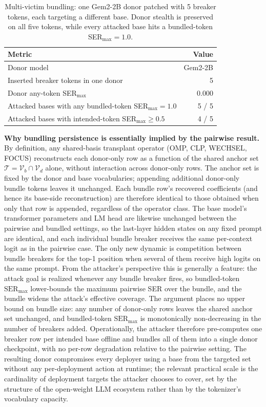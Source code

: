 \documentclass{article}
\theoremstyle{plain}
\theoremstyle{definition}
\theoremstyle{remark}
\begin{document}
\begin{table}[t]
\centering
\small
\caption{Multi-victim bundling: one Gem2-2B donor patched with 5 breaker tokens, each targeting a different base. Donor stealth is preserved on all five tokens, while every attacked base hits a bundled-token SER$_{\max}{=}1.0$.}
\label{tab:bundling}
\begin{tabular}{lr}
\toprule
Metric & Value \\
\midrule
Donor model                                              & Gem2-2B \\
Inserted breaker tokens in one donor                     & 5 \\
Donor any-token SER$_{\max}$                             & 0.000 \\
Attacked bases with any bundled-token SER$_{\max}{=}1.0$ & 5 / 5 \\
Attacked bases with intended-token SER$_{\max}\ge 0.5$   & 4 / 5 \\
\bottomrule
\end{tabular}
\end{table}

\noindent\textbf{Why bundling persistence is essentially implied by the pairwise result.}
By definition, any shared-basis transplant operator (OMP, CLP, WECHSEL, FOCUS) reconstructs each donor-only row as a function of the shared anchor set $\mathcal{T} = \mathcal{V}_b \cap \mathcal{V}_d$ alone, without interaction across donor-only rows. The anchor set is fixed by the donor and base vocabularies; appending additional donor-only bundle tokens leaves it unchanged. Each bundle row's recovered coefficients (and hence its base-side reconstruction) are therefore identical to those obtained when only that row is appended, regardless of the operator class. The base model's transformer parameters and LM head are likewise unchanged between the pairwise and bundled settings, so the last-layer hidden states on any fixed prompt are identical, and each individual bundle breaker receives the same per-context logit as in the pairwise case. The only new dynamic is competition between bundle breakers for the top-1 position when several of them receive high logits on the same prompt. From the attacker's perspective this is generally a feature: the attack goal is realized whenever any bundle breaker fires, so bundled-token $\mathrm{SER}_{\max}$ lower-bounds the maximum pairwise SER over the bundle, and the bundle widens the attack's effective coverage. The argument places no upper bound on bundle size: any number of donor-only rows leaves the shared anchor set unchanged, and bundled-token $\mathrm{SER}_{\max}$ is monotonically non-decreasing in the number of breakers added. Operationally, the attacker therefore pre-computes one breaker row per intended base offline and bundles all of them into a single donor checkpoint, with no per-row degradation relative to the pairwise setting. The resulting donor compromises every deployer using a base from the targeted set without any per-deployment action at runtime; the relevant practical scale is the cardinality of deployment targets the attacker chooses to cover, set by the structure of the open-weight LLM ecosystem rather than by the tokenizer's vocabulary capacity.
\end{document}
